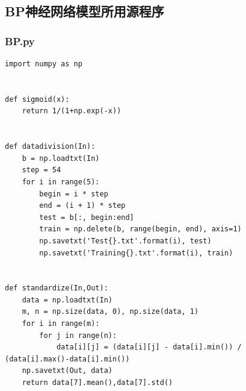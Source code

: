 \documentclass{ctexart}
\begin{document}
\subsection*{BP神经网络模型所用源程序}
\subsubsection*{BP.py}
\begin{scriptsize}
\begin{verbatim}
import numpy as np


def sigmoid(x):
    return 1/(1+np.exp(-x))


def datadivision(In):
    b = np.loadtxt(In)
    step = 54
    for i in range(5):
        begin = i * step
        end = (i + 1) * step
        test = b[:, begin:end]
        train = np.delete(b, range(begin, end), axis=1)
        np.savetxt('Test{}.txt'.format(i), test)
        np.savetxt('Training{}.txt'.format(i), train)


def standardize(In,Out):
    data = np.loadtxt(In)
    m, n = np.size(data, 0), np.size(data, 1)
    for i in range(m):
        for j in range(n):
            data[i][j] = (data[i][j] - data[i].min()) / (data[i].max()-data[i].min())
    np.savetxt(Out, data)
    return data[7].mean(),data[7].std()



\end{verbatim}
\end{scriptsize}
\end{document}
